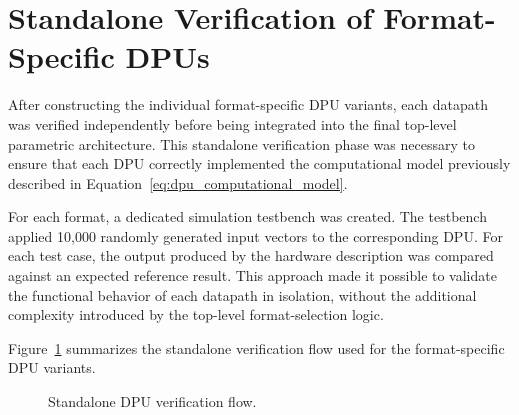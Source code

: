 \section{Standalone Verification of Format-Specific DPUs}

After constructing the individual format-specific DPU variants, each datapath was verified independently before being integrated into the final top-level parametric architecture. This standalone verification phase was necessary to ensure that each DPU correctly implemented the computational model previously described in Equation~\eqref{eq:dpu_computational_model}.

For each format, a dedicated simulation testbench was created. The testbench applied 10,000 randomly generated input vectors to the corresponding DPU. For each test case, the output produced by the hardware description was compared against an expected reference result. This approach made it possible to validate the functional behavior of each datapath in isolation, without the additional complexity introduced by the top-level format-selection logic.

Figure~\ref{fig:dpu_standalone_verification_flow} summarizes the standalone verification flow used for the format-specific DPU variants.

\begin{figure}[h]
\centering
{}
\caption{Standalone DPU verification flow.}
\label{fig:dpu_standalone_verification_flow}
\end{figure}

